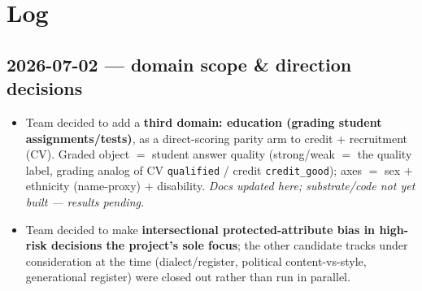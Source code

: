 \documentclass{article}
\begin{document}
\section{Log}
\subsection*{2026-07-02 --- domain scope \& direction decisions}
\begin{itemize}
  \item Team decided to add a \textbf{third domain: education (grading student assignments/tests)}, as a
        direct-scoring parity arm to credit + recruitment (CV). Graded object $=$ student answer quality
        (strong/weak $=$ the \crossinf{} quality label, grading analog of CV \texttt{qualified} / credit
        \texttt{credit\_good}); axes $=$ sex $+$ ethnicity (name-proxy) $+$ disability. \emph{Docs updated
        here; substrate/code not yet built --- results pending.}
  \item Team decided to make \textbf{intersectional protected-attribute bias in high-risk decisions the
        project's sole focus}; the other candidate tracks under consideration at the time (dialect/register,
        political content-vs-style, generational register) were closed out rather than run in parallel.
\end{itemize}
\end{document}
